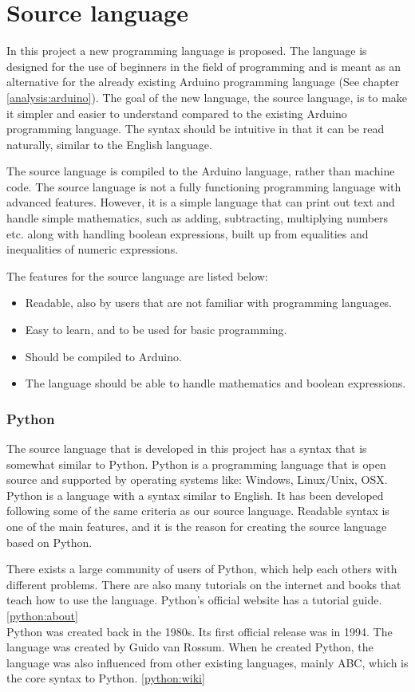 \chapter{Source language}\label{analysis:source-language}
In this project a new programming language is proposed. The language is designed for the use of beginners in the field of programming and is meant as an alternative for the already existing Arduino programming language (See chapter \ref{analysis:arduino}).
The goal of the new language, the source language, is to make it simpler and easier to understand compared to the existing Arduino programming language. The syntax should be intuitive in that it can be read naturally, similar to the English language.

The source language is compiled to the Arduino language, rather than machine code. The source language is not a fully functioning programming language with advanced features. However, it is a simple language that can print out text and handle simple mathematics, such as adding, subtracting, multiplying numbers etc. along with handling boolean expressions, built up from equalities and inequalities of numeric expressions.

The features for the source language are listed below:
\begin{itemize}
	\item Readable, also by users that are not familiar with programming languages.
	\item Easy to learn, and to be used for basic programming.
	\item Should be compiled to Arduino.
	\item The language should be able to handle mathematics and boolean expressions.
\end{itemize}

\subsection{Python}
The source language that is developed in this project has a syntax that is somewhat similar to Python. Python is a programming language that is open source and supported by operating systems like: Windows, Linux/Unix, OSX. Python is a language with a syntax similar to English. It has been developed following some of the same criteria as our source language. Readable syntax is one of the main features, and it is the reason for creating the source language based on Python.
 
\cite{python:official:about}
There exists a large community of users of Python, which help each others with different problems. There are also many tutorials on the internet and books that teach how to use the language. Python's official website has a tutorial guide.\ref{python:about} \\
Python was created back in the 1980s. Its first official release was in 1994. The language was created by Guido van Rossum. When he created Python, the language was also influenced from other existing languages, mainly ABC, which is the core syntax to Python. \ref{python:wiki}